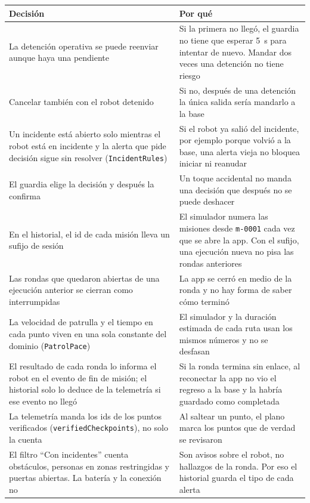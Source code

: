 \begin{table}[H]
\centering\small
\begin{tabularx}{\textwidth}{@{}L L@{}}
\toprule
\textbf{Decisión} & \textbf{Por qué} \\
\midrule
La detención operativa se puede reenviar aunque haya una pendiente & Si la primera no llegó, el guardia no tiene que esperar 5~s para intentar de nuevo. Mandar dos veces una detención no tiene riesgo \\
Cancelar también con el robot detenido & Si no, después de una detención la única salida sería mandarlo a la base \\
Un incidente está abierto solo mientras el robot está en incidente y la alerta que pide decisión sigue sin resolver (\texttt{IncidentRules}) & Si el robot ya salió del incidente, por ejemplo porque volvió a la base, una alerta vieja no bloquea iniciar ni reanudar \\
El guardia elige la decisión y después la confirma & Un toque accidental no manda una decisión que después no se puede deshacer \\
En el historial, el id de cada misión lleva un sufijo de sesión & El simulador numera las misiones desde \texttt{m-0001} cada vez que se abre la app. Con el sufijo, una ejecución nueva no pisa las rondas anteriores \\
Las rondas que quedaron abiertas de una ejecución anterior se cierran como interrumpidas & La app se cerró en medio de la ronda y no hay forma de saber cómo terminó \\
La velocidad de patrulla y el tiempo en cada punto viven en una sola constante del dominio (\texttt{PatrolPace}) & El simulador y la duración estimada de cada ruta usan los mismos números y no se desfasan \\
El resultado de cada ronda lo informa el robot en el evento de fin de misión; el historial solo lo deduce de la telemetría si ese evento no llegó & Si la ronda termina sin enlace, al reconectar la app no vio el regreso a la base y la habría guardado como completada \\
La telemetría manda los ids de los puntos verificados (\texttt{verifiedCheckpoints}), no solo la cuenta & Al saltear un punto, el plano marca los puntos que de verdad se revisaron \\
El filtro ``Con incidentes'' cuenta obstáculos, personas en zonas restringidas y puertas abiertas. La batería y la conexión no & Son avisos sobre el robot, no hallazgos de la ronda. Por eso el historial guarda el tipo de cada alerta \\
\bottomrule
\end{tabularx}
\end{table}

